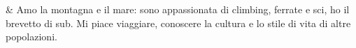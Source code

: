 & Amo la montagna e il mare: sono appassionata di climbing, ferrate e sci, ho il brevetto di sub. Mi piace viaggiare, conoscere la cultura e lo stile di vita di altre popolazioni.\\
